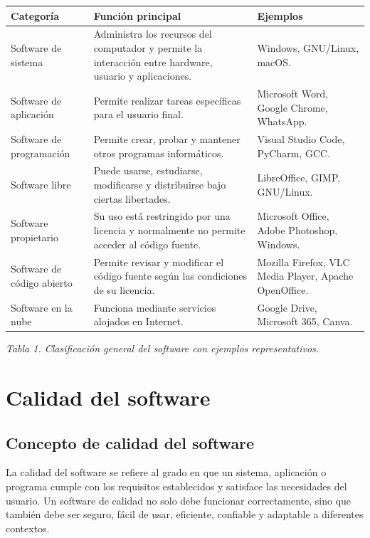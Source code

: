 \documentclass[12pt,a4paper]{article}
\begin{document}
	\begin{center}
		\begin{tabular}{|p{3cm}|p{5cm}|p{6cm}|}
			\hline
			\textbf{Categoría} & \textbf{Función principal} & \textbf{Ejemplos} \\ \hline
			Software de sistema & Administra los recursos del computador y permite la interacción entre hardware, usuario y aplicaciones. & Windows, GNU/Linux, macOS. \\ \hline
			Software de aplicación & Permite realizar tareas específicas para el usuario final. & Microsoft Word, Google Chrome, WhatsApp. \\ \hline
			Software de programación & Permite crear, probar y mantener otros programas informáticos. & Visual Studio Code, PyCharm, GCC. \\ \hline
			Software libre & Puede usarse, estudiarse, modificarse y distribuirse bajo ciertas libertades. & LibreOffice, GIMP, GNU/Linux. \\ \hline
			Software propietario & Su uso está restringido por una licencia y normalmente no permite acceder al código fuente. & Microsoft Office, Adobe Photoshop, Windows. \\ \hline
			Software de código abierto & Permite revisar y modificar el código fuente según las condiciones de su licencia. & Mozilla Firefox, VLC Media Player, Apache OpenOffice. \\ \hline
			Software en la nube & Funciona mediante servicios alojados en Internet. & Google Drive, Microsoft 365, Canva. \\ \hline
		\end{tabular}
		
		\textit{Tabla 1. Clasificación general del software con ejemplos representativos.}
	\end{center}
	
	\section{Calidad del software}
	
	\subsection{Concepto de calidad del software}
	
	La calidad del software se refiere al grado en que un sistema, aplicación o programa cumple con los requisitos establecidos y satisface las necesidades del usuario. Un software de calidad no solo debe funcionar correctamente, sino que también debe ser seguro, fácil de usar, eficiente, confiable y adaptable a diferentes contextos.
	
\end{document}
